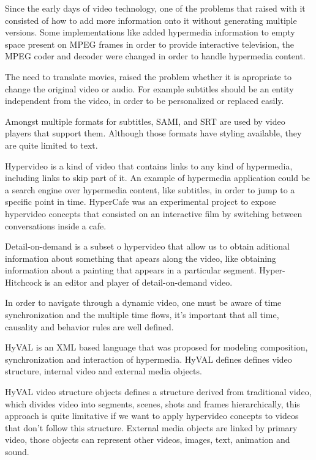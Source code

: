 
  Since the early days of video technology, one of the problems that raised with it consisted of how to add more information onto it without generating multiple versions. Some implementations like \cite{embedded} added hypermedia information to empty space present on \ac{MPEG} frames in order to provide interactive television, the \ac{MPEG} coder and decoder were changed in order to handle hypermedia content.

  The need to translate movies, raised the problem whether it is apropriate to change the original video or audio. For example subtitles should be an entity independent from the video, in order to be personalized or replaced easily.
 
  Amongst multiple formats for subtitles, \ac{SAMI}, and \ac{SRT} are used by video players that support them. Although those formats have styling available, they are quite limited to text. 

  Hypervideo is a kind of video that contains links to any kind of hypermedia, including links to skip part of it. An example of hypermedia application could be a search engine over hypermedia content, like subtitles, in order to jump to a specific point in time. HyperCafe \cite{hypercafe} was an experimental project to expose hypervideo concepts that consisted on an interactive film by switching between conversations inside a cafe.
 
  Detail-on-demand is a subset o hypervideo that allow us to obtain aditional information about something that apears along the video, like obtaining information about a painting that appears in a particular segment. Hyper-Hitchcock\cite{hitchcock} is an editor and player of detail-on-demand video.

  In order to navigate through a dynamic video, one must be aware of time synchronization and the multiple time flows, it's important that all time, causality and behavior rules are well defined.
 
  HyVAL\cite{hyval} is an \ac{XML} based language that was proposed for modeling composition, synchronization and interaction of hypermedia. HyVAL defines defines video structure, internal video and external media objects. 

  HyVAL video structure objects defines a structure derived from traditional video, which divides video into segments, scenes, shots and frames hierarchically, this approach is quite limitative if we want to apply hypervideo concepts to videos that don't follow this structure. External media objects are linked by primary video, those objects can represent other videos, images, text, animation and sound.

